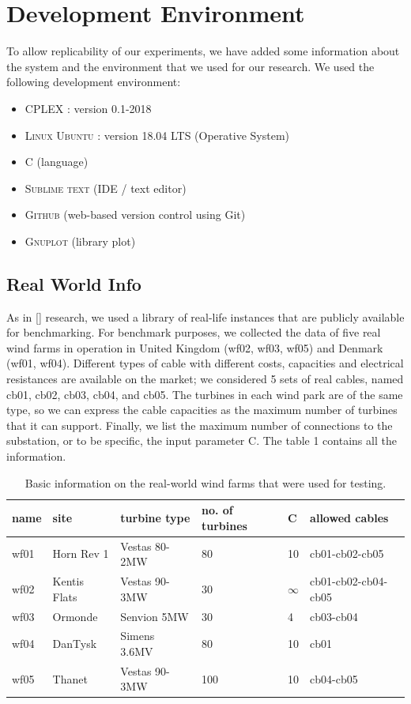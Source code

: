 
\chapter{Development Environment}
\label{chp:1-Environment}
To allow replicability of our experiments, we have added some information about the system and the environment that we used for our research. 
We used the following development environment:
\begin{itemize}
\item \textsc{CPLEX} :  version 0.1-2018
\item \textsc{Linux Ubuntu} : version 18.04 LTS (Operative System)
\item \textsc{C}  	(language)
\item \textsc{Sublime text} (IDE / text editor)
\item \textsc{Github} (web-based version control using Git)
\item \textsc{Gnuplot} (library plot)
\end{itemize}

\section{Real World Info}
As in [\cite{wfcp}] research, we used a library of real-life instances that are publicly available for benchmarking.
For benchmark purposes, we collected the data of five real wind farms in operation in United Kingdom (wf02, wf03, wf05) and Denmark (wf01, wf04). Different types of cable with different costs, capacities and electrical resistances are available on the market; we considered 5 sets of real cables, named cb01, cb02, cb03, cb04, and cb05. The turbines in each wind park are of the same type, so we can express the cable capacities as the maximum number of turbines that it can support. Finally, we list the maximum number of connections to the substation, or to be specific, the input parameter C. The table 1 contains all the information.
\begin{table}[!htbp]\label{tab:realWorld}
\center
\begin{tabular}{llllll}
\hline
name & site         & turbine type  & no. of turbines & C  & allowed cables      \\ \hline
wf01 & Horn Rev 1   & Vestas 80-2MW & 80              & 10 & cb01-cb02-cb05      \\
wf02 & Kentis Flats & Vestas 90-3MW & 30              & $\infty$   & cb01-cb02-cb04-cb05 \\
wf03 & Ormonde      & Senvion 5MW   & 30              & 4  & cb03-cb04           \\
wf04 & DanTysk      & Simens 3.6MV  & 80              & 10 & cb01                \\
wf05 & Thanet       & Vestas 90-3MW & 100             & 10 & cb04-cb05           \\ \hline
\end{tabular}
\caption{Basic information on the real-world wind farms that were used for testing.}
\end{table}

